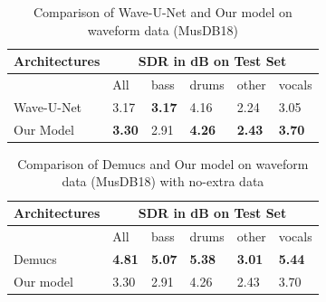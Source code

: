 \documentclass[final]{cvpr}
\begin{document}
\begin{table}[]
   \begin{tabular}{|l|lllll|}
   \hline
   Architectures & \multicolumn{5}{c|}{SDR in dB on Test Set}                                                                                                                        \\ \hline
                 & \multicolumn{1}{l|}{All}           & \multicolumn{1}{l|}{bass}          & \multicolumn{1}{l|}{drums}         & \multicolumn{1}{l|}{other}         & vocals        \\ \hline
   Wave-U-Net    & \multicolumn{1}{l|}{3.17}          & \multicolumn{1}{l|}{\textbf{3.17}} & \multicolumn{1}{l|}{4.16}          & \multicolumn{1}{l|}{2.24}          & 3.05          \\ \hline
   Our Model     & \multicolumn{1}{l|}{\textbf{3.30}} & \multicolumn{1}{l|}{2.91}          & \multicolumn{1}{l|}{\textbf{4.26}} & \multicolumn{1}{l|}{\textbf{2.43}} & \textbf{3.70} \\ \hline
   \end{tabular}
   
   \caption{Comparison of Wave-U-Net and Our model on waveform data (MusDB18)}
   \label{wave-unet-vs-our-model}
\end{table}

\begin{table}[]
   \begin{tabular}{|l|lllll|}
   \hline
   Architectures & \multicolumn{5}{c|}{SDR in dB on Test Set}                                                                                                                        \\ \hline
                 & \multicolumn{1}{l|}{All}           & \multicolumn{1}{l|}{bass}          & \multicolumn{1}{l|}{drums}         & \multicolumn{1}{l|}{other}         & vocals        \\ \hline
   Demucs        & \multicolumn{1}{l|}{\textbf{4.81}} & \multicolumn{1}{l|}{\textbf{5.07}} & \multicolumn{1}{l|}{\textbf{5.38}} & \multicolumn{1}{l|}{\textbf{3.01}} & \textbf{5.44} \\ \hline
   Our model     & \multicolumn{1}{l|}{3.30}          & \multicolumn{1}{l|}{2.91}          & \multicolumn{1}{l|}{4.26}          & \multicolumn{1}{l|}{2.43}          & 3.70          \\ \hline
   \end{tabular}
   \caption{Comparison of Demucs and Our model on waveform data (MusDB18) with no-extra data }
   \label{demucs-vs-our-model}
\end{table}
\end{document}

